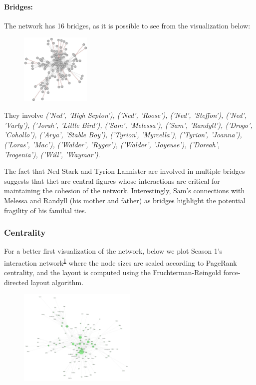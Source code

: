 \documentclass[10pt,twocolumn,letterpaper]{article}
\begin{document}
\paragraph{Bridges:}

The network has 16 bridges, as it is possible to see from the visualization below:

\begin{figure}[!h]
\centering
    \includegraphics[width=0.3\textwidth]{img/s1/bridges.jpg}
\end{figure}

They involve \textit{('Ned', 'High Septon'), ('Ned', 'Roose'), ('Ned', 'Steffon'), ('Ned', 'Varly'), ('Jorah', 'Little Bird'), ('Sam', 'Melessa'), ('Sam', 'Randyll'), ('Drogo', 'Cohollo'), ('Arya', 'Stable Boy'), ('Tyrion', 'Myrcella'), ('Tyrion', 'Joanna'), ('Loras', 'Mac'), ('Walder', 'Ryger'), ('Walder', 'Joyeuse'), ('Doreah', 'Irogenia'), ('Will', 'Waymar')}.

The fact that Ned Stark and Tyrion Lannister are involved in multiple bridges suggests that thet are central figures whose interactions are critical for maintaining the cohesion of the network. Interestingly, Sam's connections with Melessa and Randyll (his mother and father) as bridges highlight the potential fragility of his familial ties.

\subsubsection{Centrality}

For a better first visualization of the network, below we plot Season 1's interaction network\textsuperscript{\ref{fig:pr_s1}} where the node sizes are scaled according to PageRank centrality, and the layout is computed using the Fruchterman-Reingold force-directed layout algorithm.

\begin{figure}[!h]
    \centering
    \includegraphics[width=0.5\textwidth]{img/s1/pagerank_network.jpg}
    \label{fig:pr_s1}
\end{figure}
\end{document}
